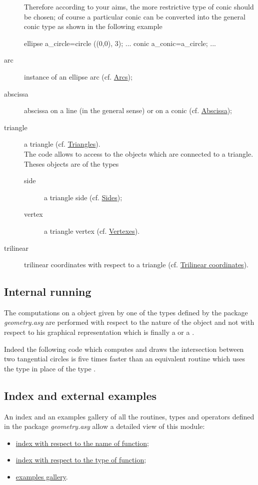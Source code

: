 \documentclass[pdftex]{article}
\newcommand{\geo}{the package \emph{geometry.asy}\xspace}
\begin{document}
\begin{description}
  Therefore according to your aims, the more restrictive type of conic
  should be chosen; of course a particular conic can be converted into
  the general conic type as shown in the following example
    \begin{aVerbatim}
    ellipse a_circle=circle ((0,0), 3);
    ...
    conic a_conic=a_circle;
    ...
  \end{aVerbatim}
\item[\index{arc}arc] instance of an ellipse arc (cf. \href{#section.arc}{Arcs});
\item[\index{abscissa}abscissa] abscissa on a line (in the general sense) or on a conic
 (cf. \href{#section.abscissa}{Abscissa});
\item[\index{triangle}triangle] a triangle (cf. \href{#section.triangle}{Triangles}).\\
  The code  allows to access to the objects
  which are connected to a triangle. Theses objects are of the types
  \begin{description}
  \item[side] a triangle side (cf. \href{#subsection.side}{Sides});
  \item[vertex] a triangle vertex
     (cf. \href{#subsection.vertex}{Vertexes}).
  \end{description}
\item[\index{trilinear}trilinear] trilinear coordinates with respect to
  a triangle (cf. \href{#subsection.trilinear}{Trilinear coordinates}).
\end{description}

\subsection{Internal running}
The computations on a object given by one of the types defined by \geo
are performed with respect to the nature of the object and not with
respect to his graphical representation which is finally a 
or a .

Indeed the following code which computes and draws the intersection
between two tangential circles is five times faster than an equivalent
routine which uses the type  in place of the type .
\subsection{Index and external examples}
An index and an examples gallery of all the routines, types and
operators defined in \geo allow a detailed view of this module:
\begin{itemize}
\item
  \href{http://piprim.tuxfamily.org/asymptote/geometry/modules/geometry.asy.index.sign.html}{index
    with respect to the name of function};
\item
  \href{http://piprim.tuxfamily.org/asymptote/geometry/modules/geometry.asy.index.type.html}{index
    with respect to the type of function};
\item
  \href{http://piprim.tuxfamily.org/asymptote/geometry/index.html}{examples gallery}.
\end{itemize}
\end{document}
